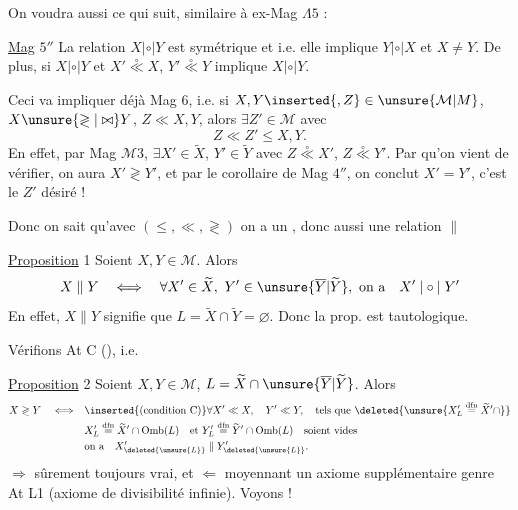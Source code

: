 On voudra aussi ce qui suit, similaire à ex-Mag $\Lambda5$ :

\uline{Mag} $5''$ La relation $X\mathrel{|\circ|}Y$ est symétrique et  i.e. elle implique $Y\mathrel{|\circ|}X$ et $X\ne Y$. De plus, si $X\mathrel{|\circ|}Y$ et $X'\overset{\circ}{\ll}X$, $Y'\overset{\circ}{\ll}Y$ implique $X\mathrel{|\circ|}Y$.

Ceci va impliquer déjà Mag $6$, i.e. si $X,Y\inserted{,Z}\in\unsure{\mathcal M|M}$, $X\unsure{\gtrless|\bowtie}Y$, $Z\ll X,Y$, alors $\exists Z'\in\mathcal M$ avec
\[
Z\ll Z'\leq X,Y.
\]
En effet, par Mag $\mathcal M3$,  $\exists X'\in\widetilde X$, $Y'\in\widetilde Y$ avec $Z\overset{\circ}{\ll}X'$, $Z\overset{\circ}{\ll}Y'$. Par   qu'on vient de vérifier, on aura $X'\gtrless Y'$, et par le corollaire de Mag $4''$, on conclut $X'=Y'$, c'est le $Z'$ désiré !

Donc on sait qu'avec $(\leq,\ll,\gtrless)$ on a un ,  donc aussi une relation $\parallel$

\uline{Proposition} 1 Soient $X,Y\in\mathcal M$. Alors
\[
X\parallel Y\quad\Longleftrightarrow\quad\forall X'\in\widetilde X,\ Y'\in\unsure{\overline Y|\widetilde Y},\ \text{on a}\quad X'\mathrel{|\circ|}Y'
\]
En effet, $X\parallel Y$ signifie que  $L=\widetilde X\cap\widetilde Y=\varnothing$.  Donc la prop. est tautologique.

Vérifions At C (), i.e.

\uline{Proposition} 2  Soient $X,Y\in\mathcal M$, $L=\widetilde X\cap\unsure{\overline Y|\widetilde Y}$.  Alors
\[
\begin{aligned}
X\gtrless Y\quad\Longleftrightarrow\quad&\inserted{\text{(condition C)}}\forall X'\ll X,\quad Y'\ll Y,\quad\text{tels que }\deleted{\unsure{X'_L\overset{\mathrm{dfn}}{=}\widetilde X'\cap}}\\
&X'_L\overset{\mathrm{dfn}}{=}\widetilde X'\cap\operatorname{Omb}(L)\quad\text{et }Y'_L\overset{\mathrm{dfn}}{=}\widetilde Y'\cap\operatorname{Omb}(L)\quad\text{soient vides}\\
&\text{on a}\quad X'_{\deleted{\unsure{L}}}\parallel Y'_{\deleted{\unsure{L}}}.
\end{aligned}
\]
$\Longrightarrow$ sûrement toujours vrai, et $\Longleftarrow$ moyennant un axiome  supplémentaire genre At L1 (axiome de divisibilité infinie). Voyons !
